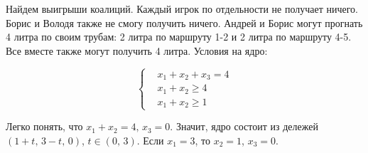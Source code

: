 	Найдем выигрыши коалиций. Каждый игрок по отдельности не получает ничего. Борис и Володя также не смогу получить ничего. Андрей и Борис могут прогнать 4 литра по своим трубам: 2 литра по маршруту 1-2 и 2 литра по маршруту 4-5. Все вместе также могут получить 4 литра. Условия на ядро:
	
	\[
	\left\{
		\begin{aligned}
			& x_1 + x_2 + x_3 = 4 \\
			& x_1 + x_2 \geq 4 \\
			& x_1 + x_2 \geq 1
		\end{aligned}
	\right.
	\]
	
	Легко понять, что $x_1 + x_2 = 4, \, x_3 = 0$. Значит, ядро состоит из дележей $(1+t,\, 3-t,\, 0)$, $t \in (0,\,3)$. Если $x_1 = 3$, то $x_2 = 1$, $x_3 = 0$.
	
	